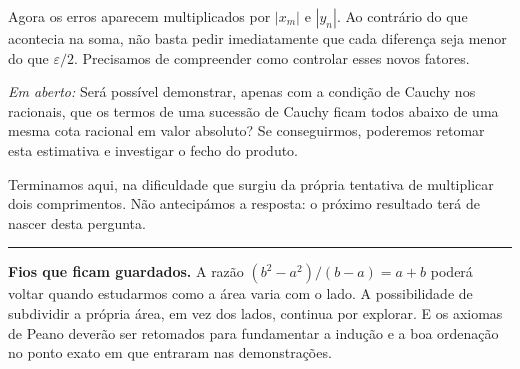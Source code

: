\documentclass[11pt,a4paper]{article}
\newcommand{\emaberto}[1]{\par\smallskip\noindent\textit{Em aberto:} #1\par\smallskip}
\begin{document}
Agora os erros aparecem multiplicados por $|x_m|$ e $|y_n|$. Ao contrário do que acontecia na soma, não basta pedir imediatamente que cada diferença seja menor do que $\varepsilon/2$. Precisamos de compreender como controlar esses novos fatores.

\emaberto{Será possível demonstrar, apenas com a condição de Cauchy nos racionais, que os termos de uma sucessão de Cauchy ficam todos abaixo de uma mesma cota racional em valor absoluto? Se conseguirmos, poderemos retomar esta estimativa e investigar o fecho do produto.}

Terminamos aqui, na dificuldade que surgiu da própria tentativa de multiplicar dois comprimentos. Não antecipámos a resposta: o próximo resultado terá de nascer desta pergunta.
\vspace{8mm}
\noindent\color{azul}\rule{\linewidth}{0.5pt}
\vspace{2mm}
\noindent\textbf{Fios que ficam guardados.} A razão $(b^2-a^2)/(b-a)=a+b$ poderá voltar quando estudarmos como a área varia com o lado. A possibilidade de subdividir a própria área, em vez dos lados, continua por explorar. E os axiomas de Peano deverão ser retomados para fundamentar a indução e a boa ordenação no ponto exato em que entraram nas demonstrações.
\end{document}
